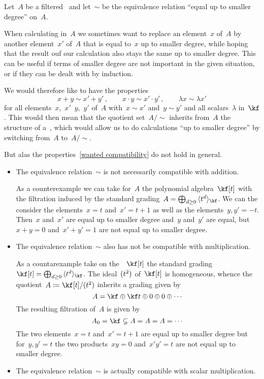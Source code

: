 \begin{fluff}
	Let~$A$ be a filtered~{\algebra{$\kf$}} and let~$\sim$ be the equivalence relation \enquote{equal up to smaller degree} on~$A$.
	
	When calculating in~$A$ we sometimes want to replace an element~$x$ of~$A$ by another element~$x'$ of~$A$ that is equal to~$x$ up to smaller degree, while hoping that the result ouf our calculation also stays the same up to smaller degree.
	This can be useful if terms of smaller degree are not important in the given situation, or if they can be dealt with by induction.
	
	We would therefore like to have the properties
	\begin{equation}
		\label{wanted compatibility}
		x + y
		\sim
		x' + y' \,,
		\qquad
		x \cdot y
		\sim
		x' \cdot y' \,,
		\qquad
		\lambda x \sim \lambda x'
	\end{equation}
	for all elements~$x$,~$x'$~$y$,~$y'$ of~$A$ with~$x \sim x'$ and~$y \sim y'$ and all scalars~$\lambda$ in~$\kf$.
	This would then mean that the quotient set~$A/{\sim}$ inherits from~$A$ the structure of a~{\algebra{$\kf$}}, which would allow us to do calculations \enquote{up to smaller degree} by switching from~$A$ to~$A/{\sim}$.
	
	But alas the properties~\eqref{wanted compatibility} do not hold in general.%
	\begin{itemize}
		\item
			The equivalence relation~$\sim$ is not necessarily compatible with addition.

			As a counterexample we can take for~$A$ the polynomial algebra~$\kf[t]$ with the filtration induced by the standard grading~$A = \bigoplus_{d \geq 0} {} \gen{ t^d }_{\kf}$.
			We can the consider the elements~$x = t$ and~$x' = t+1$ as well as the elements~$y, y' = -t$.
			Then~$x$ and~$x'$ are equal up to smaller degree and~$y$ and~$y'$ are equal, but~$x + y = 0$ and~$x' + y' = 1$ are not equal up to smaller degree.
		\item
			The equivalence relation~$\sim$ also has not be compatible with multiplication.
			
			As a countarexample take on the~\algebra{$\kf$}~$\kf[t]$ the standard grading~$\kf[t] = \bigoplus_{d \geq 0} {} \gen{ t^d }_{\kf}$.
			The ideal~$\lparen t^2 \rparen$ of~$\kf[t]$ is homogeneous, whence the quotient~$A \defined \kf[t] / \ideal{ t^2 }$ inherits a grading given by
			\[
				A
				=
				\kf
				\oplus
				\kf t
				\oplus
				0
				\oplus
				0
				\oplus
				\dotsb
			\]
			The resulting filtration of~$A$ is given by
			\[
				A_0
				=
				\kf
				\subsetneq
				A
				=
				A
				=
				A
				=
				\dotsb
			\]
			The two elements~$x = t$ and~$x' = t+1$ are equal up to smaller degree but for~$y, y' = t$ the two products~$xy = 0$ and~$x' y' = t$ are not equal up to smaller degree.
		\item
			The equivalence relation~$\sim$ is actually compatible with scalar multiplication.


\end{itemize}
\end{fluff}
